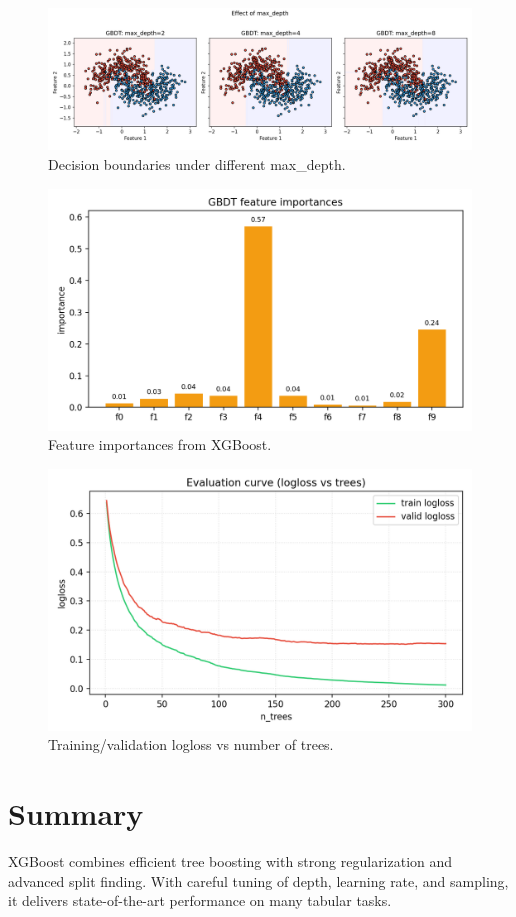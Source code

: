 \documentclass[11pt]{article}
\begin{document}
\begin{figure}[H]
  \centering
  \includegraphics[width=0.95\linewidth]{xgb_max_depth_compare.png}
  \caption{Decision boundaries under different max\_depth.}
  \label{fig:xgb_depth}
\end{figure}
\FloatBarrier

\begin{figure}[H]
  \centering
  \includegraphics[width=0.85\linewidth]{xgb_feature_importances.png}
  \caption{Feature importances from XGBoost.}
  \label{fig:xgb_fi}
\end{figure}
\FloatBarrier

\begin{figure}[H]
  \centering
  \includegraphics[width=0.85\linewidth]{xgb_eval_logloss_curve.png}
  \caption{Training/validation logloss vs number of trees.}
  \label{fig:xgb_eval}
\end{figure}
\FloatBarrier

\section{Summary}
XGBoost combines efficient tree boosting with strong regularization and advanced split finding. With careful tuning of depth, learning rate, and sampling, it delivers state-of-the-art performance on many tabular tasks.
\end{document}
